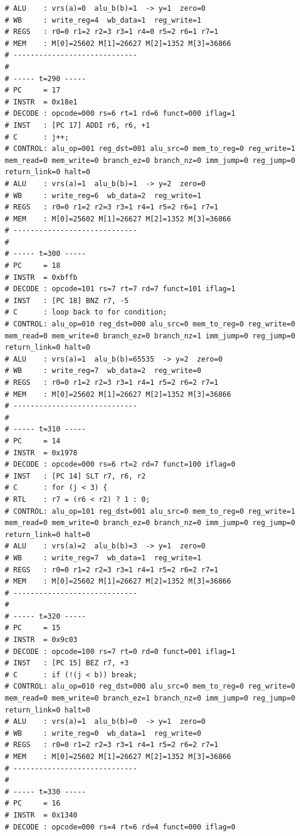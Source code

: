 \documentclass[12pt]{report}
\begin{document}
\begin{lstlisting}
# ALU    : vrs(a)=0  alu_b(b)=1  -> y=1  zero=0
# WB     : write_reg=4  wb_data=1  reg_write=1
# REGS   : r0=0 r1=2 r2=3 r3=1 r4=0 r5=2 r6=1 r7=1
# MEM    : M[0]=25602 M[1]=26627 M[2]=1352 M[3]=36866
# -----------------------------
# 
# ----- t=290 -----
# PC     = 17
# INSTR  = 0x18e1
# DECODE : opcode=000 rs=6 rt=1 rd=6 funct=000 iflag=1
# INST   : [PC 17] ADDI r6, r6, +1
# C      : j++;
# CONTROL: alu_op=001 reg_dst=001 alu_src=0 mem_to_reg=0 reg_write=1 mem_read=0 mem_write=0 branch_ez=0 branch_nz=0 imm_jump=0 reg_jump=0 return_link=0 halt=0
# ALU    : vrs(a)=1  alu_b(b)=1  -> y=2  zero=0
# WB     : write_reg=6  wb_data=2  reg_write=1
# REGS   : r0=0 r1=2 r2=3 r3=1 r4=1 r5=2 r6=1 r7=1
# MEM    : M[0]=25602 M[1]=26627 M[2]=1352 M[3]=36866
# -----------------------------
# 
# ----- t=300 -----
# PC     = 18
# INSTR  = 0xbffb
# DECODE : opcode=101 rs=7 rt=7 rd=7 funct=101 iflag=1
# INST   : [PC 18] BNZ r7, -5
# C      : loop back to for condition;
# CONTROL: alu_op=010 reg_dst=000 alu_src=0 mem_to_reg=0 reg_write=0 mem_read=0 mem_write=0 branch_ez=0 branch_nz=1 imm_jump=0 reg_jump=0 return_link=0 halt=0
# ALU    : vrs(a)=1  alu_b(b)=65535  -> y=2  zero=0
# WB     : write_reg=7  wb_data=2  reg_write=0
# REGS   : r0=0 r1=2 r2=3 r3=1 r4=1 r5=2 r6=2 r7=1
# MEM    : M[0]=25602 M[1]=26627 M[2]=1352 M[3]=36866
# -----------------------------
# 
# ----- t=310 -----
# PC     = 14
# INSTR  = 0x1978
# DECODE : opcode=000 rs=6 rt=2 rd=7 funct=100 iflag=0
# INST   : [PC 14] SLT r7, r6, r2
# C      : for (j < 3) {
# RTL    : r7 = (r6 < r2) ? 1 : 0;
# CONTROL: alu_op=101 reg_dst=001 alu_src=0 mem_to_reg=0 reg_write=1 mem_read=0 mem_write=0 branch_ez=0 branch_nz=0 imm_jump=0 reg_jump=0 return_link=0 halt=0
# ALU    : vrs(a)=2  alu_b(b)=3  -> y=1  zero=0
# WB     : write_reg=7  wb_data=1  reg_write=1
# REGS   : r0=0 r1=2 r2=3 r3=1 r4=1 r5=2 r6=2 r7=1
# MEM    : M[0]=25602 M[1]=26627 M[2]=1352 M[3]=36866
# -----------------------------
# 
# ----- t=320 -----
# PC     = 15
# INSTR  = 0x9c03
# DECODE : opcode=100 rs=7 rt=0 rd=0 funct=001 iflag=1
# INST   : [PC 15] BEZ r7, +3
# C      : if (!(j < b)) break;
# CONTROL: alu_op=010 reg_dst=000 alu_src=0 mem_to_reg=0 reg_write=0 mem_read=0 mem_write=0 branch_ez=1 branch_nz=0 imm_jump=0 reg_jump=0 return_link=0 halt=0
# ALU    : vrs(a)=1  alu_b(b)=0  -> y=1  zero=0
# WB     : write_reg=0  wb_data=1  reg_write=0
# REGS   : r0=0 r1=2 r2=3 r3=1 r4=1 r5=2 r6=2 r7=1
# MEM    : M[0]=25602 M[1]=26627 M[2]=1352 M[3]=36866
# -----------------------------
# 
# ----- t=330 -----
# PC     = 16
# INSTR  = 0x1340
# DECODE : opcode=000 rs=4 rt=6 rd=4 funct=000 iflag=0

\end{lstlisting}
\end{document}
